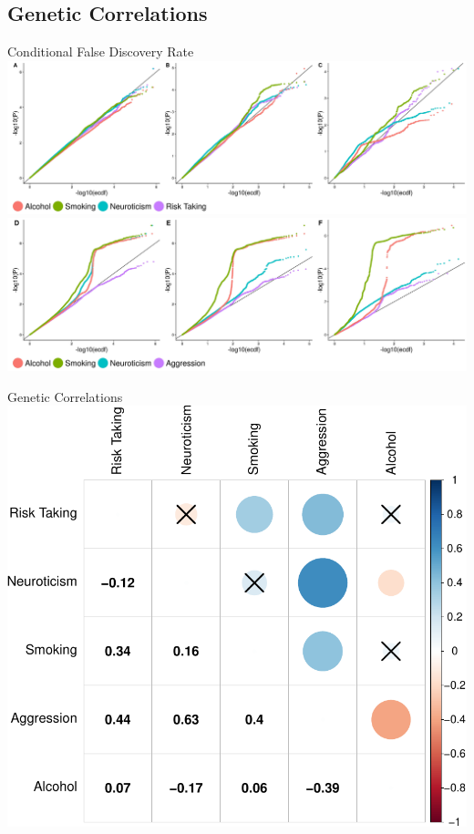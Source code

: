 \documentclass{beamer}
\begin{document}
  \subsection{Genetic Correlations}

  \begin{frame}[t]{Conditional False Discovery Rate}
    \includegraphics[width=1\linewidth]{../ukb_assoc/figure/cFDR/agg_cond.jpeg} \\
    \includegraphics[width=1\linewidth]{../ukb_assoc/figure/cFDR/risk_cond.jpeg}\\
  \end{frame}

  \begin{frame}[t]{Genetic Correlations}
  \includegraphics[width=0.8\linewidth]{../ukb_assoc/figure/genetic_corr/gcorr_plot_circle_full_se.pdf}
  \end{frame}
\end{document}
